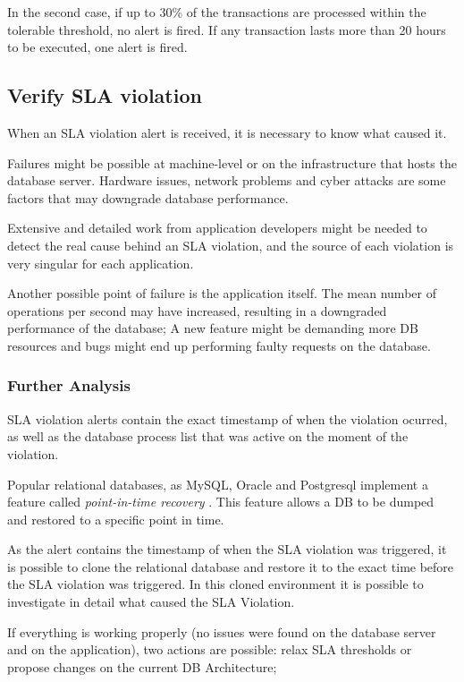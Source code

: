 In the second case, if up to 30\% of the transactions are processed within the tolerable threshold, no alert is fired. If any transaction lasts more than 20 hours to be executed, one alert is fired.


\subsection {Verify SLA violation}

When an SLA violation alert is received, it is necessary to know what caused it.

Failures might be possible at machine-level or on the infrastructure that hosts the database server. Hardware issues, network problems and cyber attacks are some factors that may downgrade database performance.  

Extensive and detailed work from application developers might be needed to detect the real cause behind an SLA violation, and the source of each violation is very singular for each application.

Another possible point of failure is the application itself. The mean number of operations per second may have increased, resulting in a downgraded performance of the database; A new feature might be demanding more DB resources and bugs might end up performing faulty requests on the database.

\subsubsection{Further Analysis}
SLA violation alerts contain the exact timestamp of when the violation ocurred, as well as the database process list that was active on the moment of the violation. 

Popular relational databases, as MySQL, Oracle and Postgresql implement a feature called \textit{point-in-time recovery} \cite{pitrmysql} \cite{pitroracle} \cite{pitrposgres}. This feature allows a DB to be dumped and restored to a specific point in time.

As the alert contains the timestamp of when the SLA violation was triggered, it is possible to clone the relational database and restore it to the exact time before the SLA violation was triggered. In this cloned environment it is possible to investigate in detail what caused the SLA Violation. 

If everything is working properly (no issues were found on the database server and on the application), two actions are possible: relax SLA thresholds or propose changes on the current DB Architecture;


